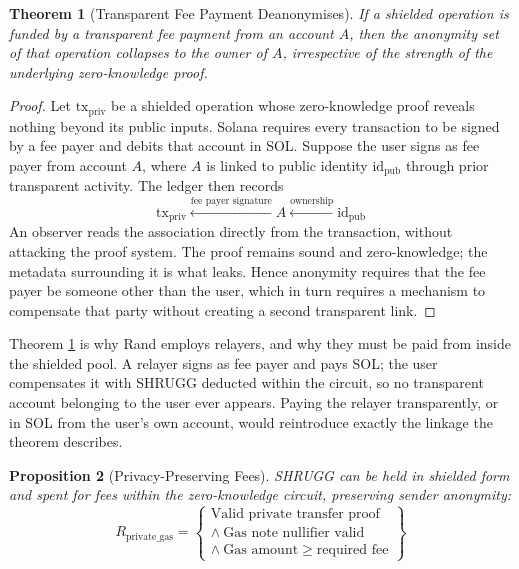 \documentclass[11pt,a4paper]{article}
\newtheorem{theorem}{Theorem}[section]
\newtheorem{proposition}[theorem]{Proposition}
\begin{document}
\begin{theorem}[Transparent Fee Payment Deanonymises]
\label{thm:feeleak}
If a shielded operation is funded by a transparent fee payment from an account $A$, then the anonymity set of that operation collapses to the owner of $A$, irrespective of the strength of the underlying zero-knowledge proof.
\end{theorem}

\begin{proof}
Let $\text{tx}_{\text{priv}}$ be a shielded operation whose zero-knowledge proof reveals nothing beyond its public inputs. Solana requires every transaction to be signed by a fee payer and debits that account in SOL. Suppose the user signs as fee payer from account $A$, where $A$ is linked to public identity $\text{id}_{\text{pub}}$ through prior transparent activity. The ledger then records
\begin{equation}
\text{tx}_{\text{priv}} \xleftarrow{\text{fee payer signature}} A \xleftarrow{\text{ownership}} \text{id}_{\text{pub}}
\end{equation}
An observer reads the association directly from the transaction, without attacking the proof system. The proof remains sound and zero-knowledge; the metadata surrounding it is what leaks. Hence anonymity requires that the fee payer be someone other than the user, which in turn requires a mechanism to compensate that party without creating a second transparent link.
\end{proof}

Theorem \ref{thm:feeleak} is why Rand employs relayers, and why they must be paid from inside the shielded pool. A relayer signs as fee payer and pays SOL; the user compensates it with SHRUGG deducted within the circuit, so no transparent account belonging to the user ever appears. Paying the relayer transparently, or in SOL from the user's own account, would reintroduce exactly the linkage the theorem describes.

\begin{proposition}[Privacy-Preserving Fees]
SHRUGG can be held in shielded form and spent for fees within the zero-knowledge circuit, preserving sender anonymity:
\begin{equation}
R_{\text{private\_gas}} = \left\{
\begin{array}{l}
\text{Valid private transfer proof} \\
\land\ \text{Gas note nullifier valid} \\
\land\ \text{Gas amount} \geq \text{required fee}
\end{array}
\right\}
\end{equation}
\end{proposition}
\end{document}
